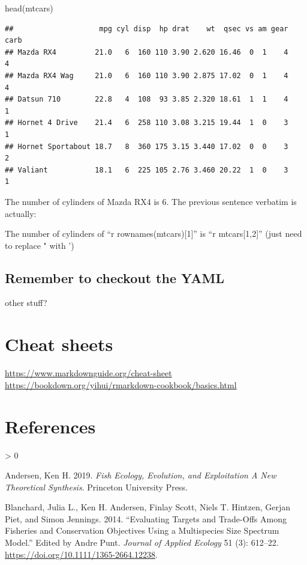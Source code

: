 \documentclass[
  11pt,
]{article}
\newenvironment{Shaded}{\begin{snugshade}}{\end{snugshade}}
\newcommand{\FunctionTok}[1]{\textcolor[rgb]{0.00,0.00,0.00}{#1}}
\newcommand{\NormalTok}[1]{#1}
\newlength{\cslhangindent}
\newenvironment{CSLReferences}[2] %
 {%
  \setlength{\parindent}{0pt}
  \ifodd #1 \everypar{\setlength{\hangindent}{\cslhangindent}}\ignorespaces\fi
  \ifnum #2 > 0
  \setlength{\parskip}{#2\baselineskip}
  \fi
 }%
 {}
\begin{document}
\begin{Shaded}
\begin{Highlighting}[]
\FunctionTok{head}\NormalTok{(mtcars)}
\end{Highlighting}
\end{Shaded}

\begin{verbatim}
##                    mpg cyl disp  hp drat    wt  qsec vs am gear carb
## Mazda RX4         21.0   6  160 110 3.90 2.620 16.46  0  1    4    4
## Mazda RX4 Wag     21.0   6  160 110 3.90 2.875 17.02  0  1    4    4
## Datsun 710        22.8   4  108  93 3.85 2.320 18.61  1  1    4    1
## Hornet 4 Drive    21.4   6  258 110 3.08 3.215 19.44  1  0    3    1
## Hornet Sportabout 18.7   8  360 175 3.15 3.440 17.02  0  0    3    2
## Valiant           18.1   6  225 105 2.76 3.460 20.22  1  0    3    1
\end{verbatim}

The number of cylinders of Mazda RX4 is 6. The previous sentence verbatim is actually:

The number of cylinders of ``r rownames(mtcars){[}1{]}'' is ``r mtcars{[}1,2{]}'' (just need to replace " with ')

\hypertarget{remember-to-checkout-the-yaml}{%
\subsection{Remember to checkout the YAML}\label{remember-to-checkout-the-yaml}}

other stuff?

\hypertarget{cheat-sheets}{%
\section{Cheat sheets}\label{cheat-sheets}}

\url{https://www.markdownguide.org/cheat-sheet}
\url{https://bookdown.org/yihui/rmarkdown-cookbook/basics.html}

\hypertarget{references}{%
\section*{References}\label{references}}

\hypertarget{refs}{}
\begin{CSLReferences}{1}{0}
\leavevmode\hypertarget{ref-andersen_fish_2019}{}%
Andersen, Ken H. 2019. \emph{Fish {Ecology}, {Evolution}, and {Exploitation A New Theoretical Synthesis}}. {Princeton University Press}.

\leavevmode\hypertarget{ref-blanchard_evaluating_2014}{}%
Blanchard, Julia L., Ken H. Andersen, Finlay Scott, Niels T. Hintzen, Gerjan Piet, and Simon Jennings. 2014. {``Evaluating Targets and Trade-Offs Among Fisheries and Conservation Objectives Using a Multispecies Size Spectrum Model.''} Edited by Andre Punt. \emph{Journal of Applied Ecology} 51 (3): 612--22. \url{https://doi.org/10.1111/1365-2664.12238}.

\end{CSLReferences}
\end{document}
